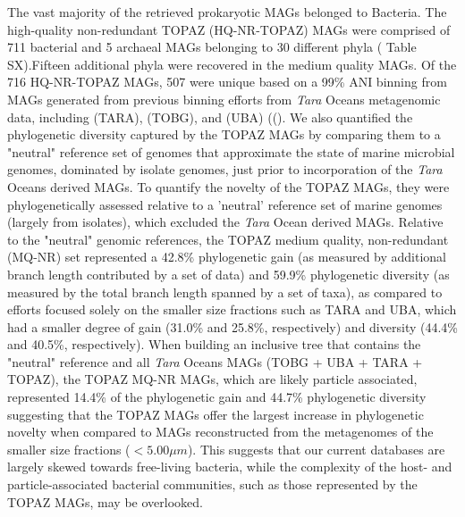 \documentclass[12pt]{article}
\numberwithin{equation}{section}
\begin{document}
The vast majority of the retrieved prokaryotic MAGs belonged to Bacteria. The high-quality non-redundant TOPAZ (HQ-NR-TOPAZ) MAGs were comprised of 711 bacterial and 5 archaeal MAGs belonging to 30 different phyla ( Table SX).Fifteen additional phyla were recovered in the medium quality MAGs. Of the 716 HQ-NR-TOPAZ MAGs, 507 were unique based on a 99\% ANI binning from MAGs generated from previous binning efforts from \textit{Tara} Oceans metagenomic data, including \citet{Delmont2018Nitrogen-fixing} (TARA), \citet{Tully2018reconstruction} (TOBG), and \citet{Parks2017Recovery} (UBA) ((). We also quantified the phylogenetic diversity captured by the TOPAZ MAGs by comparing them to a "neutral" reference set of genomes that approximate the state of marine microbial genomes, dominated by isolate genomes, just prior to incorporation of the \textit{Tara} Oceans derived MAGs. To quantify the novelty of the TOPAZ MAGs, they were phylogenetically assessed relative to a 'neutral' reference set of marine genomes (largely from isolates), which excluded the \textit{Tara} Ocean derived MAGs. Relative to the "neutral" genomic references, the TOPAZ medium quality, non-redundant (MQ-NR) set represented a 42.8\% phylogenetic gain (as measured by additional branch length contributed by a set of data) and 59.9\% phylogenetic diversity (as measured by the total branch length spanned by a set of taxa), as compared to efforts focused solely on the smaller size fractions such as TARA and UBA, which had a smaller degree of gain (31.0\% and 25.8\%, respectively) and diversity (44.4\% and 40.5\%, respectively). When building an inclusive tree that contains the "neutral" reference and all \textit{Tara} Oceans MAGs (TOBG + UBA + TARA + TOPAZ), the TOPAZ MQ-NR MAGs, which are likely particle associated, represented 14.4\% of the phylogenetic gain and 44.7\% phylogenetic diversity suggesting that the TOPAZ MAGs offer the largest increase in phylogenetic novelty when compared to MAGs reconstructed from the metagenomes of the smaller size fractions ($<5.00 \mu m$). This suggests that our current databases are largely skewed towards free-living bacteria, while the complexity of the host- and particle-associated bacterial communities, such as those represented by the TOPAZ MAGs, may be overlooked. 
\end{document}
